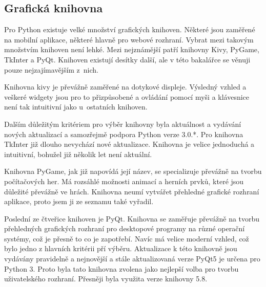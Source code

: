 \documentclass[thesis=B,czech]{resources/FITthesis}[2012/06/26]
\begin{document}
\subsection{Grafická knihovna}
Pro Python existuje velké množství grafických knihoven. Některé jsou zaměřené na mobilní aplikace, některé hlavně pro webové rozhraní. Vybrat mezi takovým množstvím knihoven není lehké. Mezi nejznámější patří knihovny Kivy, PyGame, TkInter a PyQt. Knihoven existují desítky další, ale v této bakalářce se věnuji pouze nejzajímavějším z~nich.\par

Knihovna kivy je převážně zaměřené na dotykové displeje. Výsledný vzhled a veškeré widgety jsou pro to přizpůsobené a ovládání pomocí myši a klávesnice není tak intuitivní jako u~ostatních knihoven.\par

Dalším důležitým kritériem pro výběr knihovny byla aktuálnost a vydávání nových aktualizací a samozřejmě podpora Python verze 3.0.*. Pro knihovna TkInter již dlouho nevychází nové aktualizace. Knihovna je velice jednoduchá a intuitivní, bohužel již několik let není aktuální. \par

Knihovna PyGame, jak již napovídá její název, se specializuje převážně na tvorbu počítačových her. Má rozsáhlé možnosti animací a herních prvků, které jsou důležité převážně ve hrách. Knihovna neumí vytvářet přehledné grafické rozhraní aplikace, proto jsem ji ze seznamu také vyřadil.\par

Poslední ze čtveřice knihoven je PyQt. Knihovna se zaměřuje převážně na tvorbu přehledných grafických rozhraní pro desktopové programy na různé operační systémy, což je přesně to co je zapotřebí. Navíc má velice moderní vzhled, což bylo jedno z hlavních kritérii pří výběru. Aktualizace k této knihovně jsou vydávány pravidelně a nejnovější a stále aktualizovaná verze PyQt5 je určena pro Python 3. Proto byla tato knihovna zvolena jako nejlepší volba pro tvorbu uživatelského rozhraní. Přesněji byla využita verze knihovny 5.8.
\end{document}
